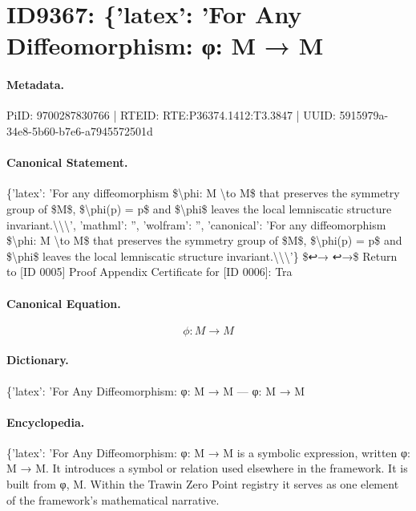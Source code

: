 \section*{ID9367: \{'latex': 'For Any Diffeomorphism: φ: M → M}
\paragraph{Metadata.}
PiID: 9700287830766 | RTEID: RTE:P36374.1412:T3.3847 | UUID: 5915979a-34e8-5b60-b7e6-a7945572501d

\paragraph{Canonical Statement.}
\{'latex': 'For any diffeomorphism \$\textbackslash{}phi: M \textbackslash{}to M\$ that preserves the symmetry group of \$M\$, \$\textbackslash{}phi(p) = p\$ and \$\textbackslash{}phi\$ leaves the local lemniscatic structure invariant.\textbackslash{}\textbackslash{}\textbackslash{}', 'mathml': '', 'wolfram': '', 'canonical': 'For any diffeomorphism \$\textbackslash{}phi: M \textbackslash{}to M\$ that preserves the symmetry group of \$M\$, \$\textbackslash{}phi(p) = p\$ and \$\textbackslash{}phi\$ leaves the local lemniscatic structure invariant.\textbackslash{}\textbackslash{}\textbackslash{}'\} \$↩→ ↩→\$ Return to [ID 0005] Proof Appendix Certificate for [ID 0006]: Tra

\paragraph{Canonical Equation.}
\[
\phi: M \to M
\]

\paragraph{Dictionary.}
\{'latex': 'For Any Diffeomorphism: φ: M → M — φ: M → M

\paragraph{Encyclopedia.}
\{'latex': 'For Any Diffeomorphism: φ: M → M is a symbolic expression, written φ: M → M. It introduces a symbol or relation used elsewhere in the framework. It is built from φ, M. Within the Trawin Zero Point registry it serves as one element of the framework's mathematical narrative.
